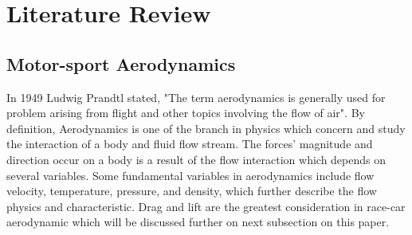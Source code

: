 \section{Literature Review}

\subsection{Motor-sport Aerodynamics}
In 1949 Ludwig Prandtl stated, "The term aerodynamics is generally used for problem arising from flight and other topics involving the flow of air\cite{Anderson2007FundamentalsJr.}". By definition, Aerodynamics is one of the branch in physics which concern and study the interaction of a body and fluid flow stream\cite{Scibor-Rylski1984RoadAerodynamics}. The forces' magnitude and direction occur on a body is a result of the flow interaction which depends on several variables. Some fundamental variables in aerodynamics include flow velocity, temperature, pressure, and density, which further describe the flow physics and characteristic. Drag and lift are the greatest consideration in race-car aerodynamic which will be discussed further on next subsection on this paper.

